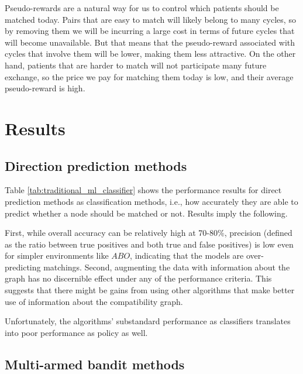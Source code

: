\documentclass[format=acmsmall, review=false]{acmart}
\begin{document}
Pseudo-rewards are a natural way for us to control which patients should be matched today. Pairs that are easy to match will likely belong to many cycles, so by removing them we will be incurring a large cost in terms of future cycles that will become unavailable. But that means that the pseudo-reward associated with cycles that involve them will be lower, making them less attractive. On the other hand, patients that are harder to match will not participate many future exchange, so the price we pay for matching them today is low, and their average pseudo-reward is high. 




\section{Results}

\subsection{Direction prediction methods} 

Table \ref{tab:traditional_ml_classifier} shows the performance results for direct prediction methods as classification methods, i.e., how accurately they are able to predict whether a node should be matched or not. Results imply the following. 

First, while overall accuracy can be relatively high at 70-80\%, precision (defined as the ratio between true positives and both true and false positives) is low even for simpler environments like $ABO$, indicating that the models are over-predicting matchings. Second, augmenting the data with information about the graph has no discernible effect under any of the performance criteria. This suggests that there might be gains from using other algorithms that make better use of information about the compatibility graph. 

Unfortunately, the algorithms' substandard performance as classifiers translates into poor performance as policy as well. 



\subsection{Multi-armed bandit methods}
\end{document}
